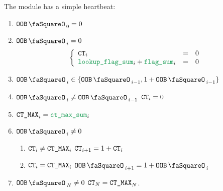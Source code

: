 The \oobMod{} module has a simple heartbeat:
\begin{enumerate}
	\item $\oobStamp_{0} = 0$
	\item \If $\oobStamp_{i} = 0$ \Then
		\[
			\left\{ \begin{array}{lcl}
				\ct_{i}                          & = & 0 \\
				\locLookupFlagSum_{i} + \flagSum_{i} & = & 0 \\
			\end{array} \right.
		\]
	\item $\oobStamp_{i} \in \{ \oobStamp_{i - 1}, 1 + \oobStamp_{i - 1} \}$
	\item \If $\oobStamp_{i} \neq \oobStamp_{i - 1}$ \Then $\texttt{CT}_{i} = 0$
	\item $\maxCt_{i} = \maxCtFlagSum_{i}$
	\item \If $\oobStamp_{i} \neq 0$ \Then
		\begin{enumerate}
			\item \If $\texttt{CT}_{i} \neq \texttt{CT\_MAX}_{i}$ \Then $\texttt{CT}_{i + 1} = 1 + \texttt{CT}_{i}$
			\item \If $\texttt{CT}_{i} =    \texttt{CT\_MAX}_{i}$ \Then $\oobStamp_{i + 1} = 1 + \oobStamp_{i}$
		\end{enumerate}
	\item \If $\oobStamp_{N} \neq 0$ \Then $\texttt{CT}_{N} = \texttt{CT\_MAX}_{N}$.
\end{enumerate}
